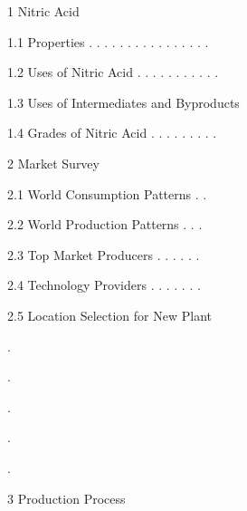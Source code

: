\documentclass[a4paper,portrait,12pt]{article}
\begin{document}
\begin{flushleft}
1 Nitric Acid
\end{flushleft}


\begin{flushleft}
1.1 Properties . . . . . . . . . . . . . . . .
\end{flushleft}


\begin{flushleft}
1.2 Uses of Nitric Acid . . . . . . . . . . .
\end{flushleft}


\begin{flushleft}
1.3 Uses of Intermediates and Byproducts
\end{flushleft}


\begin{flushleft}
1.4 Grades of Nitric Acid . . . . . . . . .
\end{flushleft}


\begin{flushleft}
2 Market Survey
\end{flushleft}


\begin{flushleft}
2.1 World Consumption Patterns . .
\end{flushleft}


\begin{flushleft}
2.2 World Production Patterns . . .
\end{flushleft}


\begin{flushleft}
2.3 Top Market Producers . . . . . .
\end{flushleft}


\begin{flushleft}
2.4 Technology Providers . . . . . . .
\end{flushleft}


\begin{flushleft}
2.5 Location Selection for New Plant
\end{flushleft}





.


.


.


.


.





\begin{flushleft}
3 Production Process
\end{flushleft}
\end{document}
